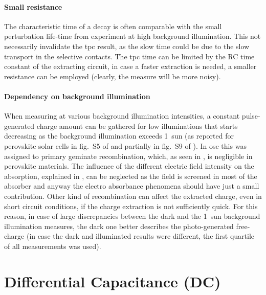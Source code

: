 \paragraph{Small resistance}
The characteristic time of a  decay is often comparable with the small perturbation life-time from  experiment at high background illumination.
This not necessarily invalidate the \gls{tpc} result, as the slow time could be due to the slow transport in the selective contacts.
The \gls{tpc} time can be limited by the RC time constant of the extracting circuit, in case a faster extraction is needed, a smaller resistance can be employed (clearly, the measure will be more noisy).

	\paragraph{Dependency on background illumination}\label{tpc_intensity}
	When measuring  at various background illumination intensities, a constant pulse-generated charge amount can be gathered for low illuminations that starts decreasing as the background illumination exceeds \SI{1}{sun} (as reported for perovskite solar cells in fig.~S5 of \cite{Du2018} and partially in fig.~S9 of \cite{Wheeler2017}).
	In \gls{osc} this was assigned to primary geminate recombination, which, as seen in , is negligible in perovskite materials.
	The influence of the different electric field intensity on the absorption, explained in , can be neglected as the field is screened in most of the absorber and anyway the electro absorbance phenomena should have just a small contribution.
	Other kind of recombination can affect the extracted charge, even in short circuit conditions, if the charge extraction is not sufficiently quick.
	For this reason, in case of large discrepancies between the dark and the \SI{1}{sun} background illumination measures, the dark one better describes the photo-generated free-charge (in case the dark and illuminated results were different, the first quartile of all  measurements was used).

\FloatBarrier
\newpage
\section{Differential Capacitance (DC)}

